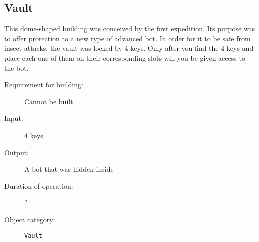 \subsection{Vault}

This dome-shaped building was conceived by the first expedition. Its purpose was to offer protection to a new type of advanced bot. In order for it to be safe from insect attacks, the vault was locked by 4 keys. Only after you find the 4 keys and place each one of them on their corresponding slots will you be given access to the bot.

\begin{description}
    \item[Requirement for building:] Cannot be built
    \item[Input:] 4 keys
    \item[Output:] A bot that was hidden inside
    \item[Duration of operation:] ? 
    \item[Object category:] \texttt{Vault}
\end{description}
